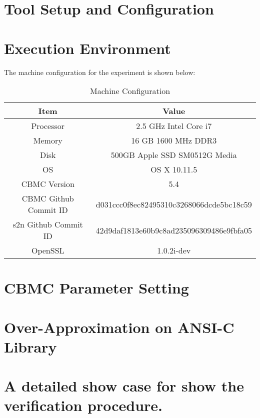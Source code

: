 \section{Tool Setup and Configuration}
\label{sec:tsc}


\section{Execution Environment}
\label{sec:ee}

The machine configuration for the experiment is shown below:
\begin{table}[H]
    \centering
    \begin{tabular}{c|c}
        \hline
        \hline
        Item & Value \\
        \hline
        \hline
        Processor & 2.5 GHz Intel Core i7\\
        Memory & 16 GB 1600 MHz DDR3\\
        Disk & 500GB Apple SSD SM0512G Media\\
        OS & OS X 10.11.5\\
        CBMC Version & 5.4\\
        CBMC Github Commit ID & d031ccc0f8ec82495310c3268066dcde5bc18c59\\
        s2n Github Commit ID & 42d9daf1813e60b9c8ad235096309486e9fbfa05\\
        OpenSSL & 1.0.2i-dev \\
        \hline
        \hline
    \end{tabular}
    \caption{Machine Configuration}
    \label{tab:mc}
\end{table}

\section{CBMC Parameter Setting} \label{sec:cbmcps}

\section{Over-Approximation on ANSI-C Library}

\section{A detailed show case for show the verification procedure.}